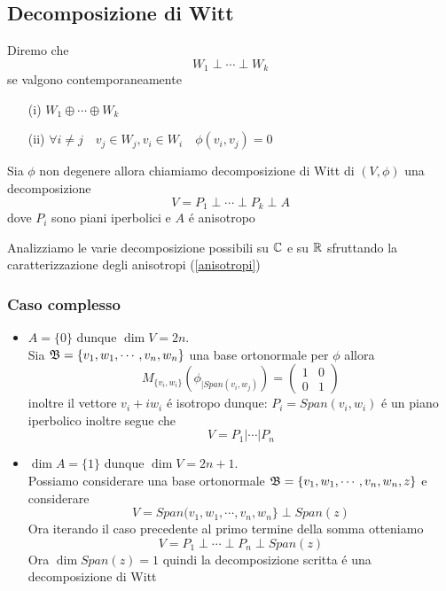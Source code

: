 \subsection{Decomposizione di Witt}
\begin{defn}
Diremo che 
$$ W_1 \perp \cdots \perp W_k $$
se valgono contemporaneamente
\begin{itemize}
\item[(i)] $W_1 \oplus \cdots \oplus W_k $
\item[(ii)] $ \forall i \neq j \quad v_j \in W_j , v_i \in W_i \quad \phi(v_i, v_j)=0 $
\end{itemize}
\end{defn}
\spazio
\begin{defn}Sia $\phi$ non degenere allora chiamiamo decomposizione di Witt di $(V,\phi) $ una decomposizione 
$$ V = P_1 \perp \cdots \perp P_k \perp A $$
dove $P_i $ sono piani iperbolici e $A$ \'e anisotropo
\end{defn}
Analizziamo le varie decomposizione possibili su $\mathbb{C}$ e su $\mathbb{R}$ sfruttando la caratterizzazione degli anisotropi (\ref{anisotropi})
\subsubsection{Caso complesso}
\begin{itemize}
\item $A=\{ 0 \} $ dunque $\dim V  = 2n $.\\
Sia $\mathfrak{B}= \{ v_1, w_1, \cdots, v_n , w_n\} $ una base ortonormale per  $\phi$ allora  
$$ M_{ \{v_i, w_i \} }  \left( \phi_{\vert Span(v_i,w_j) } \right) = \begin{pmatrix}
1 & 0 \\ 0 & 1 
\end{pmatrix}$$
inoltre il vettore $v_i + i w_i $ \'e isotropo dunque:
$P_i=Span(v_i, w_i) $ \'e un piano iperbolico inoltre segue che 
$$ V = P_1 \vert \cdots \vert P_n $$ 
\item $\dim A = \{ 1 \} $ dunque $\dim V = 2n+1 $.\\
Possiamo considerare  una base ortonormale 
$\mathfrak{B} =\{ v_1, w_1, \cdots , v_n , w_n , z \} $ e considerare 
$$ V = Span(v_1, w_1, \cdots , v_n , w_n \} \perp Span(z)$$ 
Ora iterando il caso precedente al primo termine della somma otteniamo 
$$ V = P_1 \perp \cdots \perp P_n \perp Span(z)$$
Ora $\dim Span(z) = 1 $ quindi la decomposizione scritta \'e una decomposizione di Witt
\end{itemize}
